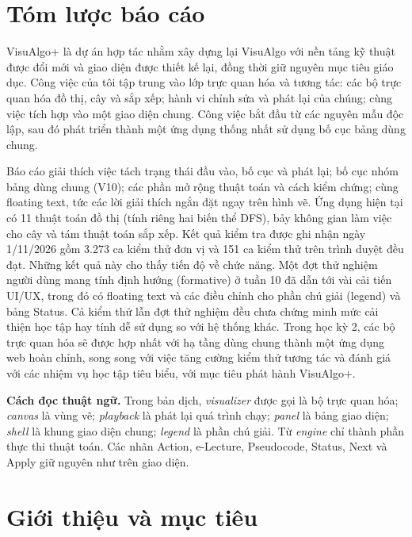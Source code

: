 \documentclass[11pt,a4paper]{article}
\begin{document}
\section*{Tóm lược báo cáo}
VisuAlgo+ là dự án hợp tác nhằm xây dựng lại VisuAlgo với nền tảng kỹ thuật được đổi mới và giao diện được thiết kế lại, đồng thời giữ nguyên mục tiêu giáo dục. Công việc của tôi tập trung vào lớp trực quan hóa và tương tác: các bộ trực quan hóa đồ thị, cây và sắp xếp; hành vi chỉnh sửa và phát lại của chúng; cùng việc tích hợp vào một giao diện chung. Công việc bắt đầu từ các nguyên mẫu độc lập, sau đó phát triển thành một ứng dụng thống nhất sử dụng bố cục bảng dùng chung.

Báo cáo giải thích việc tách trạng thái đầu vào, bố cục và phát lại; bố cục nhóm bảng dùng chung (V10); các phần mở rộng thuật toán và cách kiểm chứng; cùng floating text, tức các lời giải thích ngắn đặt ngay trên hình vẽ. Ứng dụng hiện tại có 11 thuật toán đồ thị (tính riêng hai biến thể DFS), bảy không gian làm việc cho cây và tám thuật toán sắp xếp. Kết quả kiểm tra được ghi nhận ngày 1/11/2026 gồm 3.273 ca kiểm thử đơn vị và 151 ca kiểm thử trên trình duyệt đều đạt. Những kết quả này cho thấy tiến độ về chức năng. Một đợt thử nghiệm người dùng mang tính định hướng (formative) ở tuần 10 đã dẫn tới vài cải tiến UI/UX, trong đó có floating text và các điều chỉnh cho phần chú giải (legend) và bảng Status. Cả kiểm thử lẫn đợt thử nghiệm đều chưa chứng minh mức cải thiện học tập hay tính dễ sử dụng so với hệ thống khác. Trong học kỳ 2, các bộ trực quan hóa sẽ được hợp nhất với hạ tầng dùng chung thành một ứng dụng web hoàn chỉnh, song song với việc tăng cường kiểm thử tương tác và đánh giá với các nhiệm vụ học tập tiêu biểu, với mục tiêu phát hành VisuAlgo+.

\vspace{5mm}
\textbf{Cách đọc thuật ngữ.} Trong bản dịch, \emph{visualizer} được gọi là bộ trực quan hóa; \emph{canvas} là vùng vẽ; \emph{playback} là phát lại quá trình chạy; \emph{panel} là bảng giao diện; \emph{shell} là khung giao diện chung; \emph{legend} là phần chú giải. Từ \emph{engine} chỉ thành phần thực thi thuật toán. Các nhãn Action, e-Lecture, Pseudocode, Status, Next và Apply giữ nguyên như trên giao diện.
\vspace{4mm}
\setcounter{tocdepth}{1}
\tableofcontents

\page
\section{Giới thiệu và mục tiêu}
\end{document}
